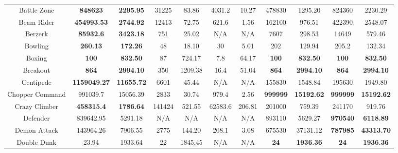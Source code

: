 \documentclass[nohyperref]{article}
\newcommand{\best}[1]{\textbf{#1}}
\theoremstyle{plain}
\begin{document}
\begin{table}[!hb]
\begin{center}
\begin{tabular}{|c |c c| c c| c c| c c| c c|}
 Battle Zone        & \textbf{848623         }& \textbf{2295.95}      &31225      & 83.86      &4031.2    & 10.27   & 478830      & 1295.20                   &824360            &2230.29\\
 Beam Rider         & \textbf{454993.53}      & \textbf{2744.92}      &12413      & 72.75      &621.6     & 1.56    & 162100      & 976.51                    &422390            &2548.07\\
 Berzerk            & \textbf{85932.6        }& \textbf{3423.18}      &751        & 25.02      &N/A       & N/A     & 7607        & 298.53                    &14649             &579.46\\
 Bowling            & \textbf{260.13         }& \textbf{172.26 }      &48         & 18.10      &30        & 5.01    & 202         & 129.94                    &205.2             &132.34\\
 Boxing             & \textbf{100}                   & \textbf{832.50}       &87         & 724.17     &7.8       & 64.17   & \best{100}  & \best{832.50  }    &\textbf{100}      &\textbf{832.50}  \\
 Breakout           & \textbf{864}                   & \textbf{2994.10}      &350        & 1209.38    &16.4      & 51.04   & \best{864}  & \best{2994.10    } &\textbf{864}      &\textbf{2994.10}\\
 Centipede          & \textbf{1159049.27}     & \textbf{11655.72}     &6601       & 45.44      &N/A       & N/A     & 155830      & 1548.84                   &195630            &1949.80\\
 Chopper Command    & 991039.7              & 15056.39     &2833       & 30.74      & 979.4    & 2.56    & \best{999999}& \best{15192.62}                     &\textbf{999999}   &\textbf{15192.62}\\
 Crazy Climber      & \textbf{458315.4}       & \textbf{1786.64    }  &141424     & 521.55     & 62583.6  & 206.81  & 201000      & 759.39                    &241170	            &919.76\\
 Defender           & 839642.95             & 5291.18      & N/A       & N/A        & N/A      & N/A     & 893110      & 5629.27               &\textbf{970540}   &\textbf{6118.89}\\
 Demon Attack       & 143964.26             & 7906.55      & 2775     &144.20      & 208.1    & 3.08    & 675530      & 37131.12                &\textbf{787985}                     &\textbf{43313.70}\\
 Double Dunk        & 23.94          & 1933.64      & 22        &1845.45     & N/A      & N/A     & \textbf{24}          & \textbf{1936.36}                   &\textbf{24 }      &\textbf{1936.36}\\

\end{tabular}
\end{center}
\end{table}
\end{document}

